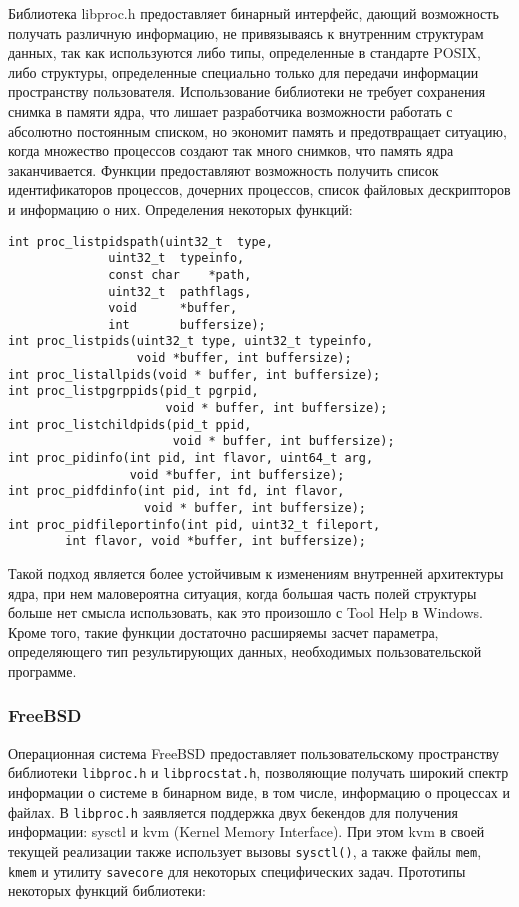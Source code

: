 Библиотека libproc.h предоставляет бинарный интерфейс, дающий возможность получать
различную информацию, не привязываясь к внутренним структурам данных, так как
используются либо типы, определенные в стандарте POSIX, либо структуры,
определенные специально только для передачи информации пространству
пользователя\cite{libproc}. Использование библиотеки не требует сохранения
снимка в памяти ядра, что лишает разработчика возможности работать с абсолютно
постоянным списком, но экономит память и предотвращает ситуацию, когда множество
процессов создают так много снимков, что память ядра заканчивается. Функции
предоставляют возможность получить список идентификаторов процессов, дочерних
процессов, список файловых дескрипторов и информацию о них. Определения
некоторых функций:

\medskip
\begin{lstlisting}[style=cstyle]
int	proc_listpidspath(uint32_t	type,
			  uint32_t	typeinfo,
			  const char	*path,
			  uint32_t	pathflags,
			  void		*buffer,
			  int		buffersize);
int proc_listpids(uint32_t type, uint32_t typeinfo,
                  void *buffer, int buffersize);
int proc_listallpids(void * buffer, int buffersize);
int proc_listpgrppids(pid_t pgrpid,
                      void * buffer, int buffersize);
int proc_listchildpids(pid_t ppid,
                       void * buffer, int buffersize);
int proc_pidinfo(int pid, int flavor, uint64_t arg,
                 void *buffer, int buffersize);
int proc_pidfdinfo(int pid, int fd, int flavor,
                   void * buffer, int buffersize);
int proc_pidfileportinfo(int pid, uint32_t fileport,
        int flavor, void *buffer, int buffersize);
\end{lstlisting}
\medskip

Такой подход является более устойчивым к изменениям внутренней архитектуры ядра,
при нем маловероятна ситуация, когда большая часть полей структуры больше нет
смысла использовать, как это произошло с Tool Help в Windows. Кроме того, такие
функции достаточно расширяемы засчет параметра, определяющего тип результирующих
данных, необходимых пользовательской программе.

\subsubsection{FreeBSD}
\label{sub:domain:analogs:freebsd}

Операционная система FreeBSD предоставляет пользовательскому пространству
библиотеки \texttt{libproc.h} и \texttt{libprocstat.h}, позволяющие получать
широкий спектр информации о системе в бинарном виде, в том числе, информацию о
процессах и файлах\cite{freebsd}. В \texttt{libproc.h} заявляется поддержка двух
бекендов для получения информации: sysctl и kvm (Kernel Memory Interface). При
этом kvm в своей текущей реализации также использует вызовы \texttt{sysctl()}, а
также файлы \texttt{mem}, \texttt{kmem} и утилиту \texttt{savecore} для
некоторых специфических задач. Прототипы некоторых функций библиотеки:

